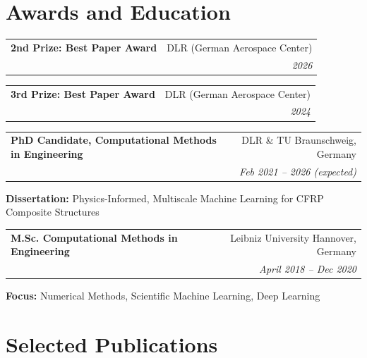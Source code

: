 \documentclass[a4paper,20pt]{article}
\makeatletter
\newcommand{\resumeSubheading}[4]{
  \vspace{-1pt}\item
    \begin{tabular*}{0.97\textwidth}{l@{\extracolsep{\fill}}r}
      \textbf{#1} & #2 \\
      \textit{#3} & \textit{#4} \\
    \end{tabular*}\vspace{-5pt}
}
\makeatother
\begin{document}
\vspace{0.2cm}
\vspace{5pt}

\newpage

\section{\color{blue}Awards and Education}

\resumeSubheading
  {\textcolor{green!50!black}{\faAward} \textbf{2nd Prize: Best Paper Award}}
  {DLR (German Aerospace Center)}{}{2026}
\resumeSubheading
  {\textcolor{green!50!black}{\faAward} \textbf{3rd Prize: Best Paper Award}}
  {DLR (German Aerospace Center)}{}{2024}
\vspace{4pt}

\resumeSubheading
  {\textcolor{green!50!black}{PhD Candidate,} Computational Methods in Engineering}
  {DLR \& TU Braunschweig, Germany}{}{Feb 2021 -- 2026 (expected)}
  \vspace{2pt}
\textbf{Dissertation:} Physics-Informed, Multiscale Machine Learning for CFRP Composite Structures
\vspace{4pt}

\resumeSubheading
  {\textcolor{green!50!black}{M.Sc.} Computational Methods in Engineering}
  {Leibniz University Hannover, Germany}{}{April 2018 -- Dec 2020}
  \vspace{2pt}
\textbf{Focus:} Numerical Methods, Scientific Machine Learning, Deep Learning
\vspace{4pt}

\section{\color{blue}Selected Publications}
\end{document}
